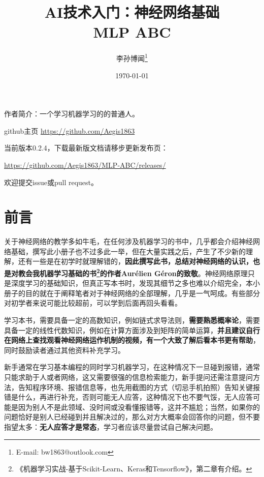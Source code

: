 \documentclass[a5paper, 11pt]{ctexbook}
\title{\textbf{\huge AI技术入门：神经网络基础 \\ \Large MLP ABC}}
\author{李孙博闻\thanks{E-mail: bw1863@outlook.com}}
\date{\today}
\begin{document}
\maketitle



作者简介：一个学习机器学习的的普通人。

github主页 \href{https://github.com/Aegis1863} {https://github.com/Aegis1863}

当前版本0.2.4，下载最新版文档请移步更新发布页：

\href{https://github.com/Aegis1863/MLP-ABC/releases/}{https://github.com/Aegis1863/MLP-ABC/releases/}

欢迎提交issue或pull request。


\chapter*{前言} %


关于神经网络的教学多如牛毛，在任何涉及机器学习的书中，几乎都会介绍神经网络基础，撰写此小册子也不过多此一举，但在大量实践之后，产生了不少新的理解，还有一些是在初学时就理解错的，\textbf{因此撰写此书，总结对神经网络的认识，也是对教会我机器学习基础的书\footnote{《机器学习实战-基于Scikit-Learn、Keras和Tensorflow》，第二章有介绍。}的作者Aurélien Géron的致敬}。神经网络原理只是深度学习的基础知识，但真正写本书时，发现其细节之多也难以介绍完全，本小册子的目的就在于阐释笔者对于神经网络的全部理解，几乎是一气呵成。有些部分对初学者来说可能比较超前，可以学到后面再回头看看。

学习本书，需要具备一定的高数知识，例如链式求导法则，\textbf{需要熟悉概率论}，需要具备一定的线性代数知识，例如在计算方面涉及到矩阵的简单运算，\textbf{并且建议自行在网络上查找观看神经网络运作机制的视频，有一个大致了解后看本书更有帮助}，同时鼓励读者通过其他资料补充学习。

新手通常在学习基本编程的同时学习机器学习，在这种情况下一旦碰到报错，通常只能求助于人或者网络，这又需要很强的信息检索能力，新手提问还需注意提问方法，告知程序环境、报错信息等，也先用截图的方式（切忌手机拍照）告知关键报错是什么，再进行补充，否则可能无人应答，这种情况下也不要气馁，无人应答可能是因为别人不是此领域、没时间或没看懂报错等，这并不尴尬；当然，如果你的问题恰好是别人已经碰到并且解决过的，那么对方大概率会回答你的问题，但不要指望太多：\textbf{无人应答才是常态}，学习者应该尽量尝试自己解决问题。
\end{document}

